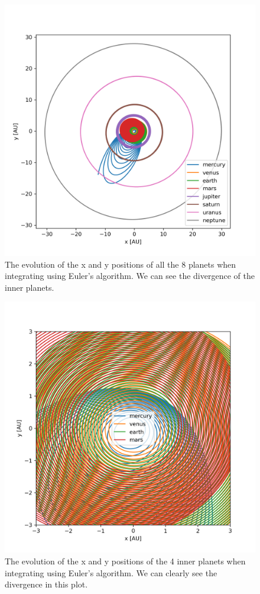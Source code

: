 \documentclass[a4paper,10pt]{article}
\begin{document}
\begin{figure}[H]
  \centering
  \includegraphics[width=.60\linewidth]{./plots/xy-euler.png}
  \caption{The evolution of the x and y positions of all the 8 planets when integrating using Euler's algorithm. We can see the divergence of the inner planets.}
  \label{fig:xy-eul}
\end{figure}

\begin{figure}[H]
  \centering
  \includegraphics[width=.60\linewidth]{./plots/xy-euler-zoom.png}
  \caption{The evolution of the x and y positions of the 4 inner planets when integrating using Euler's algorithm. We can clearly see the divergence in this plot.}
  \label{fig:xy-eul-zoom}
\end{figure}
\end{document}
